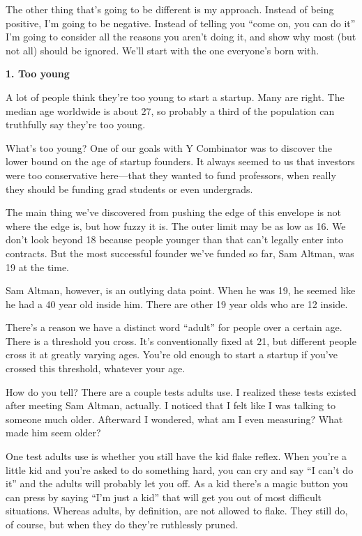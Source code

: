 The other thing that's going to be different is my approach. Instead of
being positive, I'm going to be negative. Instead of telling you ``come
on, you can do it'' I'm going to consider all the reasons you aren't
doing it, and show why most (but not all) should be ignored. We'll start
with the one everyone's born with.

\textbf{1. Too young}

A lot of people think they're too young to start a startup. Many are
right. The median age worldwide is about 27, so probably a third of the
population can truthfully say they're too young.

What's too young? One of our goals with Y Combinator was to discover the
lower bound on the age of startup founders. It always seemed to us that
investors were too conservative here---that they wanted to fund
professors, when really they should be funding grad students or even
undergrads.

The main thing we've discovered from pushing the edge of this envelope
is not where the edge is, but how fuzzy it is. The outer limit may be as
low as 16. We don't look beyond 18 because people younger than that
can't legally enter into contracts. But the most successful founder
we've funded so far, Sam Altman, was 19 at the time.

Sam Altman, however, is an outlying data point. When he was 19, he
seemed like he had a 40 year old inside him. There are other 19 year
olds who are 12 inside.

There's a reason we have a distinct word ``adult'' for people over a
certain age. There is a threshold you cross. It's conventionally fixed
at 21, but different people cross it at greatly varying ages. You're old
enough to start a startup if you've crossed this threshold, whatever
your age.

How do you tell? There are a couple tests adults use. I realized these
tests existed after meeting Sam Altman, actually. I noticed that I felt
like I was talking to someone much older. Afterward I wondered, what am
I even measuring? What made him seem older?

One test adults use is whether you still have the kid flake reflex. When
you're a little kid and you're asked to do something hard, you can cry
and say ``I can't do it'' and the adults will probably let you off. As a
kid there's a magic button you can press by saying ``I'm just a kid''
that will get you out of most difficult situations. Whereas adults, by
definition, are not allowed to flake. They still do, of course, but when
they do they're ruthlessly pruned.

